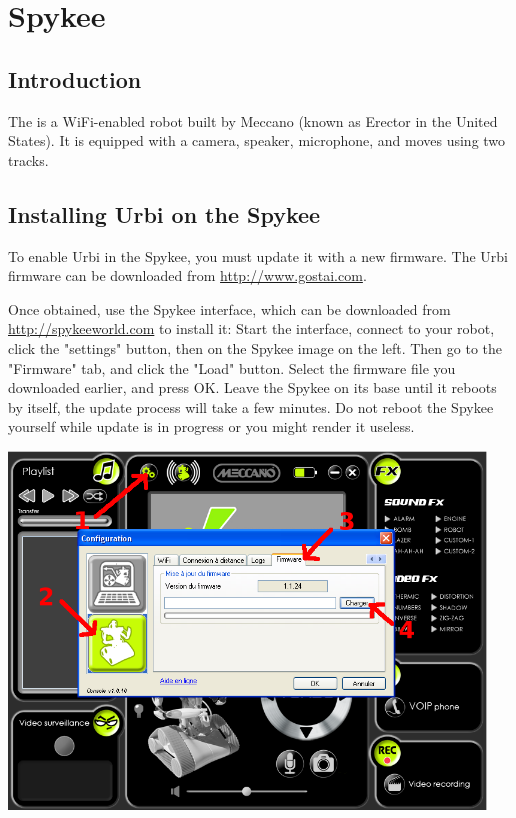 \chapter{Spykee}
\label{sec:spykee}

\section{Introduction}

The  is a WiFi-enabled robot built by Meccano (known as
Erector in the United States). It is equipped with a camera, speaker,
microphone, and moves using two tracks.

\section{Installing Urbi on the Spykee}

To enable Urbi in the Spykee, you must update it with a new firmware. The Urbi
firmware can be downloaded from \url{http://www.gostai.com}.

Once obtained, use the Spykee interface, which can be downloaded from
\url{http://spykeeworld.com} to install it: Start the interface, connect to
your robot, click the "settings" button, then on the Spykee image on the left.
Then go to the "Firmware" tab, and click the "Load" button. Select the firmware
file you downloaded earlier, and press OK. Leave the Spykee on its base until it
reboots by itself, the update process will take a few minutes. Do not reboot
the Spykee yourself while update is in progress or you might render it useless.
\begin{center}
\includegraphics[width=0.95\textwidth]{img/spykee-flash-instructions}
\end{center}

